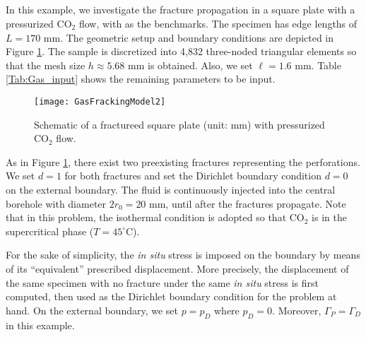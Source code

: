 \subsection{} \label{sec: co2_propagation_ex}
In this example, we investigate the fracture propagation in a square plate with a pressurized CO$_2$ flow, with \cite{ishida2016features, wang2018influence} as the benchmarks. The specimen has edge lengths of $L=170$ mm. The geometric setup and boundary conditions are depicted in Figure \ref{Fig:Gas_geometry}. The sample is discretized into 4,832 three-noded triangular elements so that the mesh size $h\approx 5.68$ mm is obtained. Also, we set $\ell=1.6$ mm. Table \ref{Tab:Gas_input} shows the remaining parameters to be input.

\begin{figure}[htbp]
	\centering
	\texttt{[image: GasFrackingModel2]}
	\caption{Schematic of a fractureed square plate (unit: mm) with pressurized CO$_2$ flow.}
	\label{Fig:Gas_geometry}
\end{figure}

As in Figure \ref{Fig:Gas_geometry}, there exist two preexisting fractures representing the perforations. We set $d=1$ for both fractures and set the Dirichlet boundary condition $d=0$ on the external boundary. The fluid is continuously injected into the central borehole with diameter $2r_0=20$ mm, until after the fractures propagate. Note that in this problem, the isothermal condition is adopted so that CO$_2$ is in the supercritical phase ($T=45^{\circ}$C).

For the sake of simplicity, the \emph{in situ} stress  is imposed on the boundary by means of its ``equivalent'' prescribed displacement. More precisely, the displacement of the same specimen with no fracture under the same \emph{in situ} stress is first computed, then used as the Dirichlet boundary condition for the problem at hand. On the external boundary, we set $p=p_D$ where $p_D=0$. Moreover, $\Gamma_P=\Gamma_D$ in this example.


